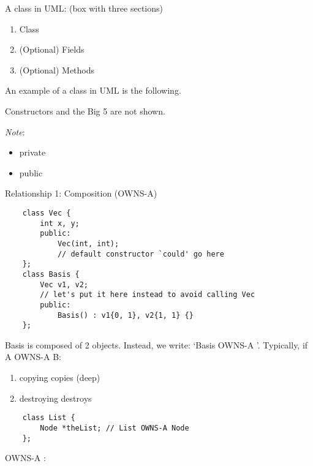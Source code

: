 A class in UML\@: (box with three sections)
\begin{enumerate}[label=(\arabic*)]
    \item Class
    \item (Optional) Fields
    \item (Optional) Methods
\end{enumerate}
An example of a class in UML is the following.
\begin{figure}[H]
    \centering
\end{figure}
Constructors and the Big 5 are not shown.

\emph{Note}:
\begin{itemize}
    \item \code{-} \textrightarrow{} private
    \item \code{+} \textrightarrow{} public
\end{itemize}

Relationship 1: Composition (OWNS-A)
\begin{lstlisting}
    class Vec {
        int x, y;
        public:
            Vec(int, int);
            // default constructor `could' go here
    };
    class Basis {
        Vec v1, v2;
        // let's put it here instead to avoid calling Vec
        public:
            Basis() : v1{0, 1}, v2{1, 1} {}
    };
\end{lstlisting}

Basis is composed of 2  objects. Instead, we write:
`Basis OWNS-A '. Typically, if A OWNS-A B\@:
\begin{enumerate}[label=(\arabic*)]
    \item copying  copies  (deep)
    \item destroying  destroys 
\end{enumerate}

\begin{lstlisting}
    class List {
        Node *theList; // List OWNS-A Node
    };
\end{lstlisting}

 OWNS-A :

\begin{figure}[H]
    \centering
\end{figure}

